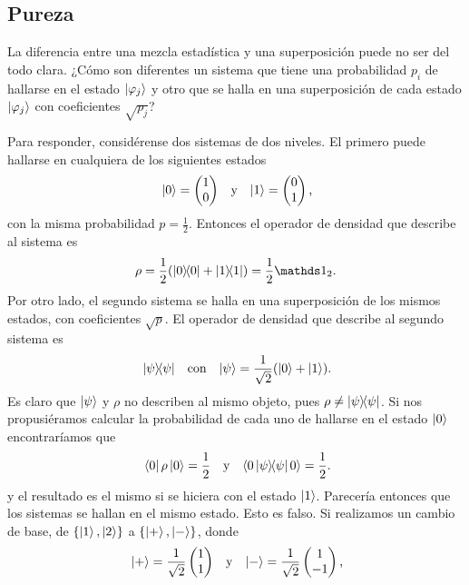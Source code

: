 \subsection{Pureza}

La diferencia entre una mezcla estadística y una superposición puede no ser del todo clara. ¿Cómo son diferentes un sistema que tiene una probabilidad $p_{i}$ de hallarse en el estado $\ket{\varphi_{j}}$ y otro que se halla en una superposición de cada estado $\ket{\varphi_{j}}$ con coeficientes $\sqrt{p_{j}}$? 

Para responder, considérense dos sistemas de dos niveles. El primero puede hallarse en cualquiera de los siguientes estados
\begin{align}
    \ket{0}=\begin{pmatrix}
        1\\
        0
    \end{pmatrix} && \text{y} && \ket{1}=\begin{pmatrix}
        0\\
        1
    \end{pmatrix}\rlap{,}\nonumber
\end{align}
con la misma probabilidad $p=\frac{1}{2}$. Entonces el operador de densidad que describe al sistema es 
\begin{equation}
    \rho=\frac{1}{2}(\dyad{0}+\dyad{1})=\frac{1}{2}\Id_{2}.\nonumber
\end{equation}
Por otro lado, el segundo sistema se halla en una superposición de los mismos estados, con coeficientes $\sqrt{p}$. El operador de densidad que describe al segundo sistema es 
\begin{align}
    \dyad{\psi} && \text{con} && \ket{\psi}=\frac{1}{\sqrt{2}}(\ket{0}+\ket{1})\rlap{.}\nonumber
\end{align}
Es claro que $\ket{\psi}$ y $\rho$ no describen al mismo objeto, pues $\rho\neq\dyad{\psi}$. Si nos propusiéramos calcular la probabilidad de cada uno de hallarse en el estado $\ket{0}$ encontraríamos que
\begin{align}
    \bra{0}\rho\ket{0}=\frac{1}{2} && \text{y} &&\langle 0 \dyad{\psi} 0\rangle=\frac{1}{2}\rlap{.}\nonumber
\end{align}
y el resultado es el mismo si se hiciera con el estado $\ket{1}$. Parecería entonces que los sistemas se hallan en el mismo estado. Esto es falso. Si realizamos un cambio de base, de $\{\ket{1},\ket{2}\}$ a $\{\ket{+},\ket{-}\}$, donde
\begin{align}
    \ket{+}=\frac{1}{\sqrt{2}}\begin{pmatrix}
        1\\
        1
    \end{pmatrix} && \text{y} && \ket{-}=\frac{1}{\sqrt{2}}\begin{pmatrix}
        1\\
        -1
    \end{pmatrix}\rlap{,}\nonumber
\end{align}
